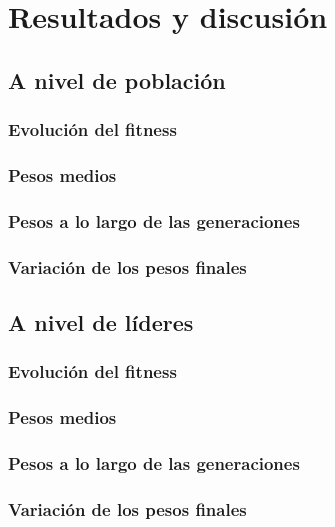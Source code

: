 \chapter{Resultados y discusión} \label{chap:resultados}

\section{A nivel de población} \label{sec:a_nivel_de_poblacion}


\subsection{Evolución del fitness} \label{sec:evolucion_fitness_poblacion}


\subsection{Pesos medios} \label{sec:pesos_medios_poblacion}


\subsection{Pesos a lo largo de las generaciones} \label{sec:pesos_a_lo_largo_generaciones_poblacion}


\subsection{Variación de los pesos finales} \label{sec:variacion_pesos_finales_poblacion}


\section{A nivel de líderes} \label{sec:a_nivel_de_lideres}


\subsection{Evolución del fitness} \label{sec:evolucion_fitness_lideres}


\subsection{Pesos medios} \label{sec:pesos_medios_lideres}


\subsection{Pesos a lo largo de las generaciones} \label{sec:pesos_a_lo_largo_generaciones_lideres}


\subsection{Variación de los pesos finales} \label{sec:variacion_pesos_finales_lideres}